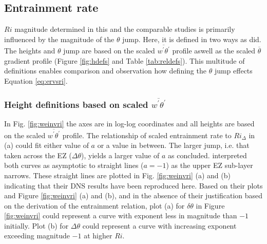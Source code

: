 \subsection{Entrainment rate}

$Ri$ magnitude determined in this and the comparable studies is primarily influenced by the magnitude of the $\theta$ jump.  Here, it is defined in two ways as \cite{FedConzMir04} did.  The heights and $\theta$ jump are based on the scaled $\overline{w^{'}\theta^{'}}$ profile aswell as the scaled $\overline{\theta}$ gradient profile (Figure \ref{fig:hdefs} and Table \ref{tab:reldefs}).  This multitude of definitions enables comparison and observation how defining the $\theta$ jump effects Equation \ref{eq:ervsri}.

\subsubsection{Height definitions based on scaled $\overline{w^{'}\theta^{'}}$}


In Fig. \ref{fig:weinvri} the axes are in log-log coordinates and all heights are based on the scaled $\overline{w^{'}\theta^{'}}$ profile. The relationship of scaled entrainment rate to $Ri_{\Delta}$ in (a) could fit either value of $a$ or a value in between.  The larger jump, i.e. that taken across the EZ ($\Delta \theta$), yields a larger value of $a$ as \cite{FedConzMir04} concluded.  \cite{GarciaMellado} interpreted both curves as asymptotic to straight lines ($a=-1$) as the upper EZ sub-layer narrows.  These straight lines are plotted in Fig. \ref{fig:weinvri} (a) and (b) indicating that their DNS results have been reproduced here. Based on their plots and Figure \ref{fig:weinvri} (a) and (b), and in the absence of their justification based on the derivation of the entrainment relation, plot (a) for $\delta \theta$ in Figure \ref{fig:weinvri} could represent a curve with exponent less in magnitude than $-1$ initially.  Plot (b) for $\Delta \theta$ could represent a curve with increasing exponent exceeding magnitude $-1$ at higher $Ri$.\\

